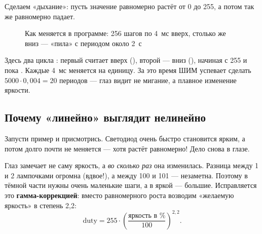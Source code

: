 Сделаем «дыхание»: пусть значение  равномерно растёт от 0 до 255, а потом так же
равномерно падает.


\begin{figure}[H]
\centering
{}
\caption{Как меняется  в программе: 256 шагов по 4~мс вверх, столько же вниз --- «пила» с периодом около 2~с}
\end{figure}

Здесь два цикла : первый считает вверх (), второй --- вниз (), начиная с 255
и пока . Каждые 4~мс  меняется на единицу. За это время ШИМ успевает сделать
$5000 \cdot 0{,}004 = 20$ периодов --- глаз видит не мигание, а плавное изменение яркости.

\subsection{Почему «линейно» выглядит нелинейно}

Запусти пример и присмотрись. Светодиод очень быстро становится ярким, а потом долго почти не
меняется --- хотя  растёт равномерно! Дело снова в глазе.

Глаз замечает не саму яркость, а \emph{во сколько раз} она изменилась. Разница между 1 и 2 лампочками
огромна (вдвое!), а между 100 и 101 --- незаметна. Поэтому в тёмной части нужны очень маленькие шаги,
а в яркой --- большие. Исправляется это \textbf{гамма-коррекцией}: вместо равномерного роста 
возводим «желаемую яркость» в степень 2,2:
\[
  \text{duty} = 255 \cdot \left(\frac{\text{яркость в \%}}{100}\right)^{2{,}2}.
\]


